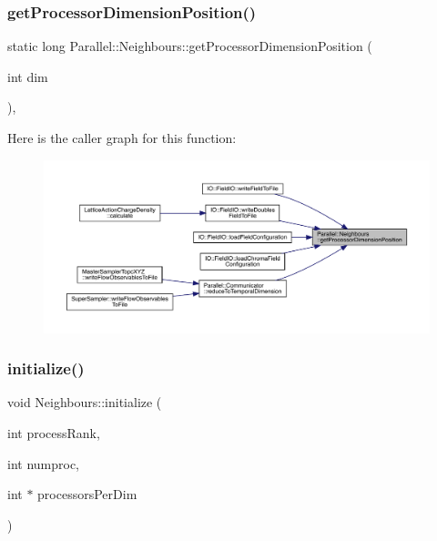 \subsubsection{\texorpdfstring{getProcessorDimensionPosition()}{getProcessorDimensionPosition()}}
{\footnotesize\ttfamily static long Parallel\+::\+Neighbours\+::get\+Processor\+Dimension\+Position (\begin{DoxyParamCaption}\item[{int}]{dim }\end{DoxyParamCaption})\hspace{0.3cm}{\ttfamily [inline]}, {\ttfamily [static]}}

Here is the caller graph for this function\+:\nopagebreak
\begin{figure}[H]
\begin{center}
\leavevmode
\includegraphics[width=350pt]{class_parallel_1_1_neighbours_ad1a2a616b4089eded3545faf11409b85_icgraph}
\end{center}
\end{figure}
\mbox{\label{class_parallel_1_1_neighbours_a59e68da5867bfa27a867ed0b443267d7}} 
\subsubsection{\texorpdfstring{initialize()}{initialize()}}
{\footnotesize\ttfamily void Neighbours\+::initialize (\begin{DoxyParamCaption}\item[{int}]{process\+Rank,  }\item[{int}]{numproc,  }\item[{int $\ast$}]{processors\+Per\+Dim }\end{DoxyParamCaption})\hspace{0.3cm}{\ttfamily [static]}}



